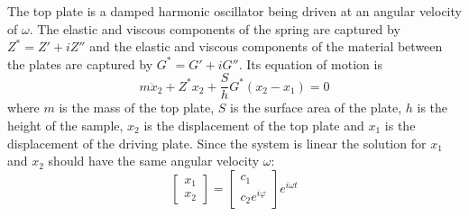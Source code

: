 \documentclass[12pt, a4paper]{article}
\numberwithin{equation}{section}
\begin{document}
The top plate is a damped harmonic oscillator being driven at an angular velocity of $\omega$. The elastic and viscous components of the spring are captured by $Z^* = Z' + iZ''$ and the elastic and viscous components of the material between the plates are captured by $G^* = G' + iG''$.
Its equation of motion is
\begin{equation}
	m\ddot{x}_2 + Z^* x_2 + \frac{S}{h}G^*(x_2 - x_1) = 0
	\label{eq:ode_5-6}
\end{equation}
where $m$ is the mass of the top plate, 
$S$ is the surface area of the plate, 
$h$ is the height of the sample, 
$x_2$ is the displacement of the top plate
and $x_1$ is the displacement of the driving plate.
Since the system is linear the solution for $x_1$ and $x_2$ should have the same angular velocity $\omega$:
\[
	\begin{bmatrix}
		x_1 \\ x_2
	\end{bmatrix}
	=
	\begin{bmatrix}
		c_1 \\ c_2 e^{i\varphi}
	\end{bmatrix}
	e^{i\omega t}
\]
\end{document}
